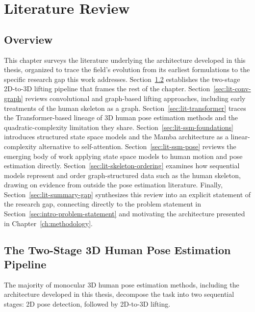 \setlength{\footskip}{8mm}

\chapter{Literature Review}
\label{ch:literature-review}

\section{Overview}
\label{sec:lit-overview}

This chapter surveys the literature underlying the architecture
developed in this thesis, organized to trace the field's evolution from
its earliest formulations to the specific research gap this work
addresses. Section~\ref{sec:lit-pipeline} establishes the two-stage
2D-to-3D lifting pipeline that frames the rest of the chapter.
Section~\ref{sec:lit-conv-graph} reviews convolutional and graph-based
lifting approaches, including early treatments of the human skeleton as a
graph. Section~\ref{sec:lit-transformer} traces the Transformer-based
lineage of 3D human pose estimation methods and the quadratic-complexity
limitation they share. Section~\ref{sec:lit-ssm-foundations} introduces
structured state space models and the Mamba architecture as a
linear-complexity alternative to self-attention.
Section~\ref{sec:lit-ssm-pose} reviews the emerging body of work applying
state space models to human motion and pose estimation directly.
Section~\ref{sec:lit-skeleton-ordering} examines how sequential models
represent and order graph-structured data such as the human skeleton,
drawing on evidence from outside the pose estimation literature. Finally,
Section~\ref{sec:lit-summary-gap} synthesizes this review into an explicit
statement of the research gap, connecting directly to the problem
statement in Section~\ref{sec:intro-problem-statement} and motivating the
architecture presented in Chapter~\ref{ch:methodology}.

\section{The Two-Stage 3D Human Pose Estimation Pipeline}
\label{sec:lit-pipeline}

The majority of monocular 3D human pose estimation methods, including the
architecture developed in this thesis, decompose the task into two
sequential stages: 2D pose detection, followed by 2D-to-3D lifting.

